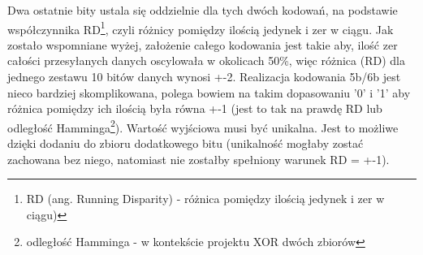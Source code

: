 \documentclass{BscUS}
\begin{document}
Dwa ostatnie bity ustala się oddzielnie dla tych dwóch kodowań, na podstawie współczynnika RD\footnote{RD (ang. Running Disparity) - różnica pomiędzy ilością jedynek i zer w ciągu)}, czyli różnicy pomiędzy ilością jedynek i zer w ciągu. Jak zostało wspomniane wyżej, założenie całego kodowania jest takie aby, ilość zer całości przesyłanych danych oscylowała w okolicach 50\%, więc różnica (RD) dla jednego zestawu 10 bitów danych wynosi +-2.
\newline
\indent Realizacja kodowania 5b/6b jest nieco bardziej skomplikowana, polega bowiem na takim dopasowaniu '0' i '1' aby różnica pomiędzy ich ilością była równa +-1 (jest to tak na prawdę RD lub odległość Hamminga\footnote{odległość Hamminga - w kontekście projektu XOR dwóch zbiorów}). Wartość wyjściowa musi być unikalna. Jest to możliwe dzięki dodaniu do zbioru dodatkowego bitu (unikalność mogłaby zostać zachowana bez niego, natomiast nie zostałby spełniony warunek RD = +-1).
\newline
\iffalse 
\end{document}
